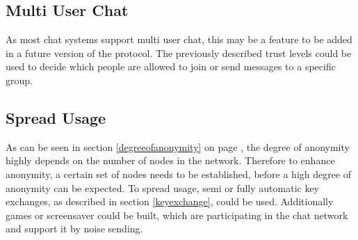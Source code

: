 \subsection{Multi User Chat}
As most chat systems support multi user chat, this may be a feature to be added
in a future version of the protocol. The previously described trust levels
could be used to decide which people are allowed to join or send messages
to a specific group.
\subsection{Spread Usage}
As can be seen in section \ref{degreeofanonymity} on page \pageref{degreeofanonymity},
the degree of anonymity highly depends on the number of nodes in the network.
Therefore to enhance anonymity, a certain set of nodes needs to be established,
before a high degree of anonymity can be expected.
To spread usage, semi or fully automatic key exchanges, as described
in section \ref{keyexchange}, could be used. Additionally 
games or screensaver could be built, which are participating in the
chat network and support it by noise sending.
